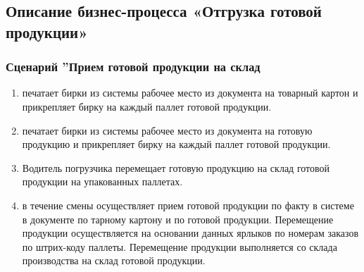 \subsection{Описание бизнес-процесса «Отгрузка готовой продукции»}
\label{bp:goods}

\subsubsection{Сценарий ''Прием готовой продукции на склад}
\label{bp:goods_1}


\ifnum{}    %

\begin{enumerate}

\item  \gaoperator печатает бирки из системы \gofro рабочее место  из документа   на товарный картон и прикрепляет бирку %
на каждый паллет готовой продукции.
\item  \operator печатает бирки из системы \gofro рабочее место  из документа   на готовую продукцию и прикрепляет бирку %
на каждый паллет готовой продукции.

\item Водитель погрузчика перемещает готовую продукцию на склад готовой продукции на упакованных паллетах.

\item  \kladovshik в течение смены осуществляет прием готовой продукции по факту в системе \gofro в документе  по тарному картону и по готовой продукции. Перемещение продукции осуществляется на основании данных ярлыков по номерам заказов по штрих-коду паллеты. 
Перемещение продукции выполняется со склада производства на склад готовой продукции.


\end{enumerate}

